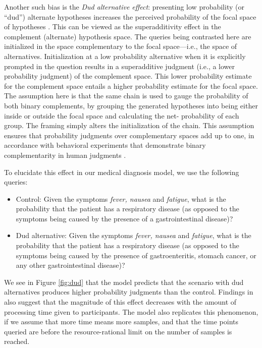 Another such bias is the \emph{Dud alternative effect}: presenting low probability (or ``dud'') alternate hypotheses increases the perceived probability of the focal space of hypotheses \citep{dud}. This can be viewed as the superadditivity effect in the complement (alternate) hypothesis space. The queries being contrasted here are initialized in the space complementary to the focal space---i.e., the space of alternatives. Initialization at a low probability alternative when it is explicitly prompted in the question results in a superadditive judgment (i.e., a lower probability judgment) of the complement space. This lower probability estimate for the complement space entails a higher probability estimate for the focal space.
The assumption here is that the same chain is used to gauge the probability of both binary complements, by grouping the generated hypotheses into being either inside or outside the focal space and calculating the net- probability of each group. The framing simply alters the initialization of the chain. This assumption ensures that probability judgments over complementary spaces add up to one, in accordance with behavioral experiments that demonstrate binary complementarity in human judgments \citep{tversky94}.

To elucidate this effect in our medical diagnosis model, we use the following queries:
\begin{itemize}
\item Control: Given the symptoms \emph{fever, nausea} and \emph{fatigue}, what is the probability that the patient has a respiratory disease (as opposed to the symptoms being caused by the presence of a gastrointestinal disease)?
\item Dud alternative: Given the symptoms \emph{fever, nausea} and \emph{fatigue}, what is the probability that the patient has a respiratory disease (as opposed to the symptoms being caused by the presence of gastroenteritis, stomach cancer, or any other gastrointestinal disease)?
\end{itemize}
We see in Figure \ref{fig:dud} that the model predicts that the scenario with dud alternatives produces higher probability judgments than the control. Findings in \citet{dud} also suggest that the magnitude of this effect decreases with the amount of processing time given to participants. The model also replicates this phenomenon, if we assume that more time means more samples, and that the time points queried are before the resource-rational limit on the number of samples is reached.


